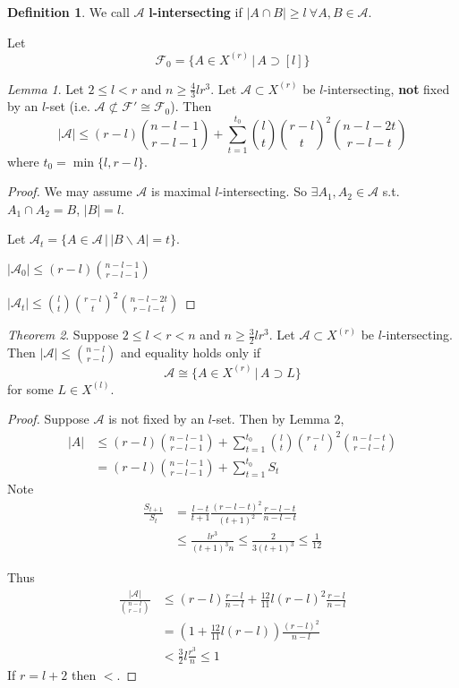 \documentclass[a4paper]{article}
\theoremstyle{definition}
\newtheorem*{definition}{Definition}
\theoremstyle{remark}
\theoremstyle{default}
\newtheorem{theorem}{Theorem}
\newtheorem{lemma}[theorem]{Lemma}
\newcommand*\abs[1]{\left|#1\right|}
\begin{document}
\begin{definition}
	We call $\mathcal{A}$ \textbf{l-intersecting} if $\abs{A \cap B} \geq l\ \forall A, B \in \mathcal{A}$.
\end{definition}

Let $$\mathcal{F}_0 = \{A \in X^{(r)} \,|\, A \supset [l] \}$$

\begin{lemma}
	Let $2 \leq l < r$ and $n \geq \frac{4}{3}lr^3$.
	Let $\mathcal{A} \subset X^{(r)}$ be $l$-intersecting,
	\textbf{not} fixed by an $l$-set (i.e. $\mathcal{A} \not\subset \mathcal{F}' \cong \mathcal{F}_0$).
	Then
	$$\abs{\mathcal{A}} \leq (r-l){n-l-1 \choose r-l-1} + \sum_{t=1}^{t_0} {l \choose t}{r-l \choose t}^2{n-l-2t \choose r-l-t}$$
	where $t_0 = \min\{l, r-l\}$.
\end{lemma}
\begin{proof}
	We may assume $\mathcal{A}$ is maximal $l$-intersecting.
	So $\exists A_1, A_2 \in \mathcal{A}$ s.t. $A_1 \cap A_2 = B$, $\abs{B} = l$.
	
	Let $\mathcal{A}_t = \{A \in \mathcal{A} \,|\, \abs{B \backslash A} = t \}$.
	
	$\abs{\mathcal{A}_0} \leq (r-l){n-l-1 \choose r-l-1}$
	
	$\abs{\mathcal{A}_t} \leq {l \choose t}{r-l \choose t}^2{n-l-2t \choose r-l-t}$
\end{proof}

\begin{theorem}
	Suppose $2 \leq l < r < n$ and $n \geq \frac{3}{2}lr^3$.
	Let $\mathcal{A} \subset X^{(r)}$ be $l$-intersecting.
	Then $\abs{\mathcal{A}} \leq {n-l \choose r-l}$ and equality holds only if
	$$\mathcal{A} \cong \{A \in X^{(r)} \,|\, A \supset L\}$$
	for some $L \in X^{(l)}$.
\end{theorem}
\begin{proof}
	Suppose $\mathcal{A}$ is not fixed by an $l$-set.
	Then by Lemma 2,
	\begin{align*}
		\abs{A} &\leq (r-l){n-l-1 \choose r-l-1} + \sum_{t=1}^{t_0}{l \choose t}{r-l \choose t}^2{n-l-t \choose r-l-t} \\
		&= (r-l){n-l-1 \choose r-l-1} + \sum_{t=1}^{t_0} S_t
	\end{align*}
	Note
	\begin{align*}
		\frac{S_{t+1}}{S_t} &= \frac{l-t}{t+1}\frac{(r-l-t)^2}{(t+1)^2}\frac{r-l-t}{n-l-t} \\
		&\leq \frac{lr^3}{(t+1)^3n} \leq \frac{2}{3(t+1)^3} \leq \frac{1}{12}
	\end{align*}
	
	Thus
	\begin{align*}
		\frac{\abs{\mathcal{A}}}{{n-l \choose r-l}} &\leq (r-l)\frac{r-l}{n-l} + \frac{12}{11}l(r-l)^2\frac{r-l}{n-l} \\
		&= (1+\frac{12}{11}l(r-l)) \frac{(r-l)^2}{n-l} \\
		&< \frac{3}{2}l\frac{r^3}{n} \leq 1
	\end{align*}
	If $r=l+2$ then $<$.
\end{proof}
\end{document}
